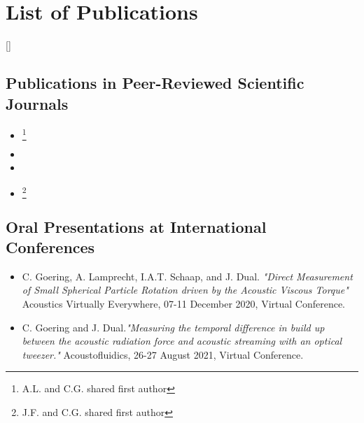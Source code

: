 \chapter*{List of Publications}


\makeatletter
\DeclareCiteCommand{\fullcite}
  {%
    }
  {\usedriver
     {}
     {}}
  {\multicitedelim}
  {}
\DeclareCiteCommand{\footfullcite}[\mkbibfootnote]
  {%
    }
  {\usedriver
     {}
     {}}
  {\multicitedelim}
  {}
\makeatother

\section*{Publications in Peer-Reviewed Scientific\\Journals}
\begin{itemize}
  \item {}\footnote{A.L. and C.G. shared first author}
  \item {}
  \item {}
  \item {}\footnote{J.F. and C.G. shared first author}
\end{itemize}


\section*{Oral Presentations at International Conferences}

\begin{itemize}
 \item C. Goering, A. Lamprecht, I.A.T. Schaap, and J. Dual.  \emph{"Direct 
Measurement of Small Spherical Particle Rotation driven by the Acoustic Viscous 
Torque"} Acoustics Virtually Everywhere, 07-11 December 2020, Virtual 
Conference.
  
\item C. Goering and J. Dual.\emph{"Measuring the temporal difference in build up 
between the acoustic radiation force and acoustic streaming with an optical 
tweezer."} Acoustofluidics, 26-27 August 2021, Virtual Conference.\\
\end{itemize}
